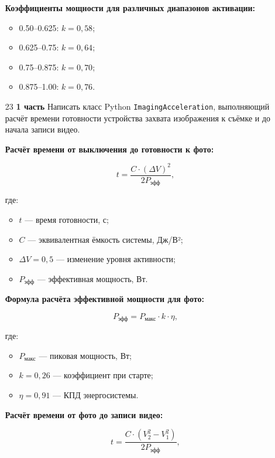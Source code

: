 \begin{enumerate}
\textbf{Коэффициенты мощности для различных диапазонов активации:}
\begin{itemize}
    \item 0.50–0.625: $k = 0{,}58$;  
    \item 0.625–0.75: $k = 0{,}64$;  
    \item 0.75–0.875: $k = 0{,}70$;  
    \item 0.875–1.00: $k = 0{,}76$.  
\end{itemize}


\item[23] \textbf{1 часть}  
Написать класс Python \texttt{ImagingAcceleration}, выполняющий расчёт времени готовности устройства захвата изображения к съёмке и до начала записи видео.

\textbf{Расчёт времени от выключения до готовности к фото:}

\begin{equation}
t = \frac{C \cdot (\Delta V)^2}{2P_{\text{эфф}}},
\end{equation}

где:  
\begin{itemize}
    \item $t$ — время готовности, с;  
    \item $C$ — эквивалентная ёмкость системы, Дж/В²;  
    \item $\Delta V = 0{,}5$ — изменение уровня активности;  
    \item $P_{\text{эфф}}$ — эффективная мощность, Вт.  
\end{itemize}

\textbf{Формула расчёта эффективной мощности для фото:}

\begin{equation}
P_{\text{эфф}} = P_{\text{макс}} \cdot k \cdot \eta,
\end{equation}

где:  
\begin{itemize}
    \item $P_{\text{макс}}$ — пиковая мощность, Вт;  
    \item $k = 0{,}26$ — коэффициент при старте;  
    \item $\eta = 0{,}91$ — КПД энергосистемы.  
\end{itemize}

\textbf{Расчёт времени от фото до записи видео:}

\begin{equation}
t = \frac{C \cdot (V_2^2 - V_1^2)}{2P_{\text{эфф}}},
\end{equation}


\end{enumerate}
